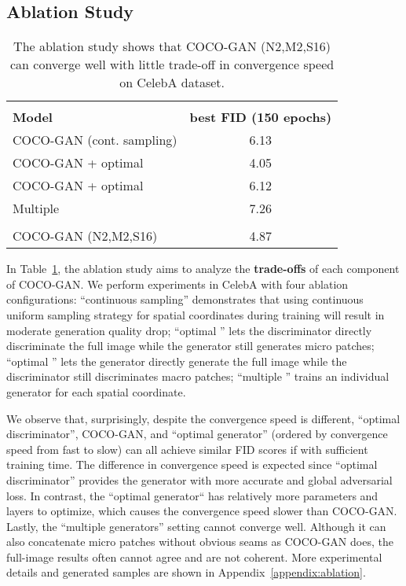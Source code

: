 \documentclass{article}
\newcommand{\modelName}{COCO-GAN }
\newcommand{\modelNamePunc}{COCO-GAN}
\begin{document}
    \subsection{Ablation Study}
        \label{exp:ablation-study}
        
        \begin{table}
            \small
            \centering
\begin{tabular}{l c}
                \toprule \\ [-1.2em]
                \textbf{Model} & \textbf{best FID (150 epochs)} \\ [0.1em]
                \hline
                \modelName (cont. sampling)      & 6.13 \\
                \modelName + optimal          & 4.05 \\
                \modelName + optimal          & 6.12 \\
                Multiple                      & 7.26 \\
                \hline \\ [-0.9em]
                \modelName (N2,M2,S16)           & 4.87 \\
                \bottomrule
            \end{tabular}
\caption{The ablation study shows that \modelName (N2,M2,S16) can converge well with little trade-off in convergence speed on CelebA  dataset.}
            \label{table:ablation}
            \vspace{-1em}
        \end{table}
        
        In Table~\ref{table:ablation}, the ablation study aims to analyze the \textbf{trade-offs} of each component of \modelNamePunc. We perform experiments in CelebA  with four ablation configurations: ``continuous sampling'' demonstrates that using continuous uniform sampling strategy for spatial coordinates during training will result in moderate generation quality drop; ``optimal '' lets the discriminator directly discriminate the full image while the generator still generates micro patches; ``optimal '' lets the generator directly generate the full image while the discriminator still discriminates macro patches; ``multiple '' trains an individual generator for each spatial coordinate. 
        
        We observe that, surprisingly, despite the convergence speed is different, ``optimal discriminator'', \modelNamePunc, and ``optimal generator'' (ordered by convergence speed from fast to slow) can all achieve similar FID scores if with sufficient training time. The difference in convergence speed is expected since ``optimal discriminator'' provides the generator with more accurate and global adversarial loss. In contrast, the ``optimal generator`` has relatively more parameters and layers to optimize, which causes the convergence speed slower than \modelNamePunc. Lastly, the ``multiple generators'' setting cannot converge well. Although it can also concatenate micro patches without obvious seams as \modelName does, the full-image results often cannot agree and are not coherent. More experimental details and generated samples are shown in Appendix~\ref{appendix:ablation}.
        
\end{document}
